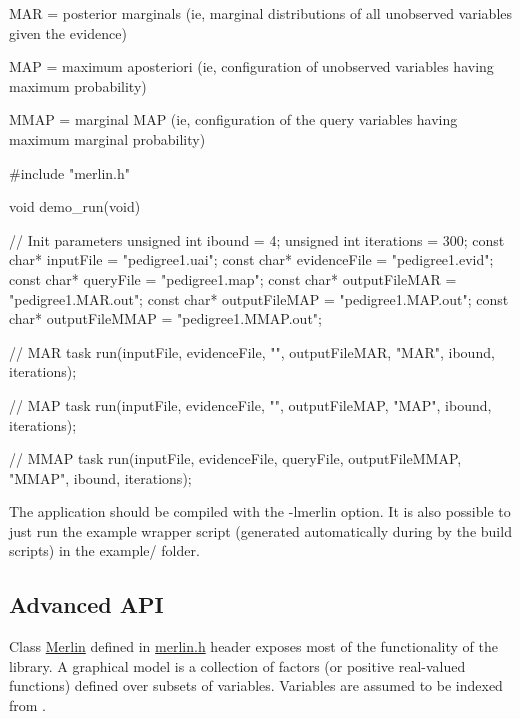 \begin{DoxyItemize}
\item M\+A\+R = posterior marginals (ie, marginal distributions of all unobserved variables given the evidence)
\item M\+A\+P = maximum aposteriori (ie, configuration of unobserved variables having maximum probability)
\item M\+M\+A\+P = marginal M\+A\+P (ie, configuration of the query variables having maximum marginal probability) \begin{DoxyVerb}  #include "merlin.h"

  void demo_run(void) {

      // Init parameters
      unsigned int ibound = 4;
      unsigned int iterations = 300;
      const char* inputFile = "pedigree1.uai";
      const char* evidenceFile = "pedigree1.evid";
      const char* queryFile = "pedigree1.map";
      const char* outputFileMAR = "pedigree1.MAR.out";
      const char* outputFileMAP = "pedigree1.MAP.out";
      const char* outputFileMMAP = "pedigree1.MMAP.out";

      // MAR task
      run(inputFile, evidenceFile, "", outputFileMAR, "MAR", ibound, iterations);

      // MAP task
      run(inputFile, evidenceFile, "", outputFileMAP, "MAP", ibound, iterations);

      // MMAP task
      run(inputFile, evidenceFile, queryFile, outputFileMMAP, "MMAP", ibound, iterations);

  }
\end{DoxyVerb}

\end{DoxyItemize}

The application should be compiled with the {\ttfamily -\/lmerlin} option. It is also possible to just run the {\ttfamily example} wrapper script (generated automatically during by the build scripts) in the {\ttfamily example/} folder.

\subsection*{Advanced A\+P\+I}

Class {\ttfamily \hyperlink{classMerlin}{Merlin}} defined in {\ttfamily \hyperlink{merlin_8h_source}{merlin.\+h}} header exposes most of the functionality of the library. A graphical model is a collection of factors (or positive real-\/valued functions) defined over subsets of variables. Variables are assumed to be indexed from {}.

